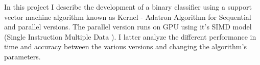 In this project I describe the development of a binary classifier using a support vector machine algorithm known as Kernel - Adatron Algorithm for Sequential and parallel versions. The parallel version runs on GPU using it's SIMD model (Single Instruction Multiple Data ). I latter analyze the different performance in time and accuracy between the various versions and changing the algorithm's parameters.